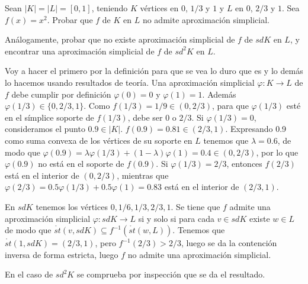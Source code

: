 \documentclass[twoside]{article}
\begin{document}
\begin{ejercicio}{1.17}
Sean $|K| = |L| = [0,1]$, teniendo $K$ vértices en $0$, $1/3$ y $1$ y $L$ en $0$, $2/3$ y $1$.
Sea $f(x) = x^2$. Probar que $f$ de $K$ en $L$ no admite aproximación simplicial.

Análogamente, probar que no existe aproximación simplicial de $f$ de $sd K$ en $L$, y encontrar una aproximación simplicial de $f$ de $sd^2 K$ en $L$.
\end{ejercicio}
\begin{solucion}
 Voy a hacer el primero por la definición para que se vea lo duro que es y lo demás lo hacemos usando resultados de teoría. Una aproximación simplicial $\varphi:K\to L$ de $f$ debe cumplir por definición $\varphi(0)=0$ y $\varphi(1)=1$. Además $\varphi(1/3)\in\{0,2/3,1\}$. Como $f(1/3)=1/9\in (0,2/3)$, para que $\varphi(1/3)$ esté en el símplice soporte de $f(1/3)$, debe ser $0$ o $2/3$. Si $\varphi(1/3)=0$, consideramos el punto $0.9\in |K|$. $f(0.9)=0.81\in (2/3,1)$. Expresando 0.9 como suma convexa de los vértices de su soporte en $L$ tenemos que $\lambda=0.6$, de modo que $\varphi(0.9)=\lambda \varphi(1/3)+(1-\lambda)\varphi(1)=0.4\in (0,2/3)$, por lo que $\varphi(0.9)$ no está en el soporte de $f(0.9)$. Si $\varphi(1/3)=2/3$, entonces $f(2/3)$ está en el interior de $(0,2/3)$, mientras que $\varphi(2/3)=0.5\varphi(1/3)+0.5\varphi(1)=0.83$ está en el interior de $(2/3,1)$.

En $sdK$ tenemos los vértices $0,1/6,1/3, 2/3,1$. Se tiene que $f$ admite una aproximación simplicial $\varphi:sdK\to L$ si y solo si para cada $v\in sdK$ existe $w\in L$ de modo que $\mathring{st}(v,sdK)\subseteq f^{-1}(\mathring{st}(w,L))$. Tenemos que $\mathring{st}(1,sdK)=(2/3,1)$, pero $f^{-1}(2/3)>2/3$, luego se da la contención inversa de forma estricta, luego $f$ no admite una aproximación simplicial. 

En el caso de $sd^2K$ se comprueba por inspección que se da el resultado. 

\end{solucion}
\end{document}
